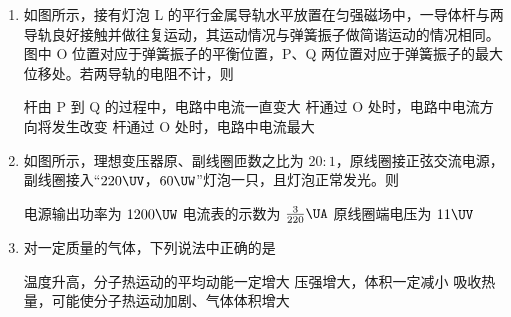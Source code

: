 \documentclass[\gkver]{gaokaozhenti}
\begin{document}
\begin{enumerate}

\item
如图所示，接有灯泡 L 的平行金属导轨水平放置在匀强磁场中，一导体杆与两导轨良好接触并做往复运动，其运动情况与弹簧振子做简谐运动的情况相同。图中 O 位置对应于弹簧振子的平衡位置，P、Q 两位置对应于弹簧振子的最大位移处。若两导轨的电阻不计，则


{杆由 P 到 Q 的过程中，电路中电流一直变大}
{杆通过 O 处时，电路中电流方向将发生改变}
{杆通过 O 处时，电路中电流最大}


\item
如图所示，理想变压器原、副线圈匝数之比为 $20:1$，原线圈接正弦交流电源，副线圈接入“$220\UV$，$60\UW$”灯泡一只，且灯泡正常发光。则


{电源输出功率为 $1200\UW$}
{电流表的示数为 $\frac{3}{220}\UA$}
{原线圈端电压为 $11\UV$}


\item
对一定质量的气体，下列说法中正确的是

{温度升高，分子热运动的平均动能一定增大}
{压强增大，体积一定减小}
{吸收热量，可能使分子热运动加剧、气体体积增大}


\end{enumerate}
\end{document}
